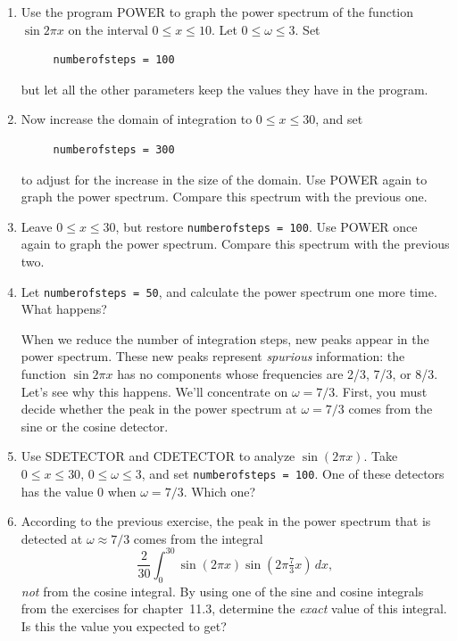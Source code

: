 \begin{enumerate}
\item Use the program POWER to graph the power spectrum of the function
$\sin{2 \pi x}$ on the interval $0 \leq x \leq 10$.  Let $0 \leq
\omega \leq 3$.  Set
\begin{verbatim}
     numberofsteps = 100
\end{verbatim}
but let all the other parameters keep the values they have in the
program.




\item Now increase the domain of integration to $0 \leq x \leq 30$, and
set 
\begin{verbatim}
     numberofsteps = 300
\end{verbatim}
to adjust for the increase in the size of the domain.  Use POWER again
to graph the power spectrum.  Compare this spectrum with the previous
one.


\item Leave $0 \leq x \leq 30$, but restore {\tt numberofsteps = 100}.
Use POWER once again to graph the power spectrum.  Compare this
spectrum with the previous two.



\item Let {\tt numberofsteps = 50}, and calculate the power spectrum
one more time.  What happens?



When we reduce the number of integration steps, new peaks appear in
the power spectrum.  These new peaks represent {\em spurious\/}
information: the function $\sin{2\pi x}$ has no components whose
frequencies are 2/3, 7/3, or 8/3.  Let's see why this happens.  We'll
concentrate on $\omega = 7/3$.  First, you must decide whether the
peak in the power spectrum at $\omega = 7/3$ comes from the sine or
the cosine detector.


\item Use SDETECTOR and CDETECTOR to analyze $\sin(2\pi x)$.  Take $0
\leq x \leq 30$, $0 \leq \omega \leq 3$, and set {\tt numberofsteps =
  100}.  One of these detectors has the value 0 when $\omega = 7/3$.
Which one?



\item According to the previous exercise, the peak in the power
spectrum that is detected at $\omega \approx 7/3$ comes from the
integral
	\[
\dfrac{2}{30}\int_0^{30} \sin(2\pi x) 
	\sin\left(2\pi \tfrac{7}{3} x\right)\, dx,
\]
{\em not\/} from the cosine integral.  By using one of the sine and
cosine integrals from the exercises for chapter~11.3, determine the
{\em exact\/} value of this integral.  Is this the value you expected
to get?




\end{enumerate}
